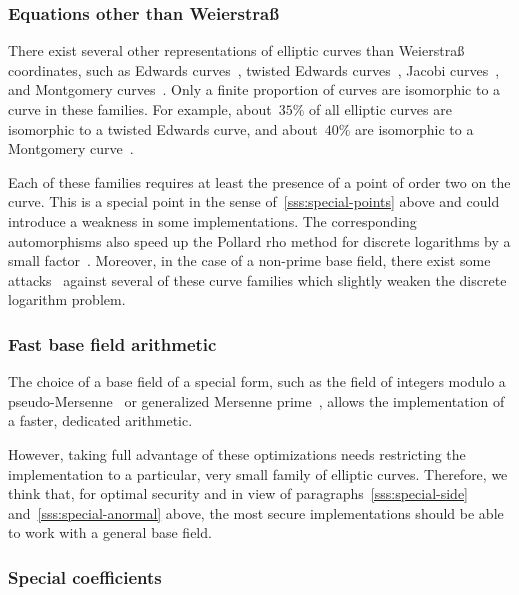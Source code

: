 \documentclass[twocolumn,letterpaper,10pt]{article}
\begin{document}
\subsubsection{Equations other than Weierstraß}
\label{sss:other-eq}

There exist several other representations of elliptic curves
than Weierstraß coordinates, such as
Edwards curves~\cite{ams2007edwards},
twisted Edwards curves~\cite{africa2008bbjl},
Jacobi curves~\cite{aaec2003bj},
and Montgomery curves~\cite{mc1987montgomery}.
Only a finite proportion of curves are isomorphic
to a curve in these families.
For example, about~$35\%$ of all elliptic curves
are isomorphic to a twisted Edwards curve,
and about~$40\%$ are isomorphic to a Montgomery curve~\cite{sac2011plut}.

Each of these families requires at least
the presence of a point of order two on the curve.
This is a special point in the sense of~\ref{sss:special-points} above
and could introduce a weakness in some implementations.
The corresponding automorphisms also speed up the Pollard rho
method for discrete logarithms by a small factor~\cite{mc2000glv}.
Moreover, in the case of a non-prime base field,
there exist some attacks~\cite{jc2014fghr}
against several of these curve families
which slightly weaken the discrete logarithm problem.

\subsubsection{Fast base field arithmetic}
\label{sss:special-fast}

The choice of a base field of a special form,
such as the field of integers modulo
a pseudo-Mersenne~\cite{pkc2006bernstein}
or generalized Mersenne prime~\cite{nist2000fips186-2},
allows the implementation of a faster, dedicated arithmetic.

However, taking full advantage of these optimizations
needs restricting the implementation to a particular, very small
family of elliptic curves.
Therefore, we think that, for optimal security and in view of
paragraphs~\ref{sss:special-side} and~\ref{sss:special-anormal} above,
the most secure implementations should be able to work with
a general base field.

\subsubsection{Special coefficients}
\label{sss:special-coeff}
\end{document}
